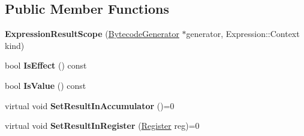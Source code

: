 \subsection*{Public Member Functions}
\begin{DoxyCompactItemize}
\item 
{\bfseries Expression\+Result\+Scope} (\hyperlink{classv8_1_1internal_1_1interpreter_1_1_bytecode_generator}{Bytecode\+Generator} $\ast$generator, Expression\+::\+Context kind)\hypertarget{classv8_1_1internal_1_1interpreter_1_1_bytecode_generator_1_1_expression_result_scope_a51adfb3450cd39cefcaf26bcd4ffcf43}{}\label{classv8_1_1internal_1_1interpreter_1_1_bytecode_generator_1_1_expression_result_scope_a51adfb3450cd39cefcaf26bcd4ffcf43}

\item 
bool {\bfseries Is\+Effect} () const \hypertarget{classv8_1_1internal_1_1interpreter_1_1_bytecode_generator_1_1_expression_result_scope_abbe25012e72d9c10bedd06449b5f65c9}{}\label{classv8_1_1internal_1_1interpreter_1_1_bytecode_generator_1_1_expression_result_scope_abbe25012e72d9c10bedd06449b5f65c9}

\item 
bool {\bfseries Is\+Value} () const \hypertarget{classv8_1_1internal_1_1interpreter_1_1_bytecode_generator_1_1_expression_result_scope_a31e3db88c75ac0ba5ff8db6fa7068706}{}\label{classv8_1_1internal_1_1interpreter_1_1_bytecode_generator_1_1_expression_result_scope_a31e3db88c75ac0ba5ff8db6fa7068706}

\item 
virtual void {\bfseries Set\+Result\+In\+Accumulator} ()=0\hypertarget{classv8_1_1internal_1_1interpreter_1_1_bytecode_generator_1_1_expression_result_scope_ab8ba50608f47cbe33f657899e31933ae}{}\label{classv8_1_1internal_1_1interpreter_1_1_bytecode_generator_1_1_expression_result_scope_ab8ba50608f47cbe33f657899e31933ae}

\item 
virtual void {\bfseries Set\+Result\+In\+Register} (\hyperlink{classv8_1_1internal_1_1interpreter_1_1_register}{Register} reg)=0\hypertarget{classv8_1_1internal_1_1interpreter_1_1_bytecode_generator_1_1_expression_result_scope_a66d3635d313e551f6e1dcaca99724053}{}\label{classv8_1_1internal_1_1interpreter_1_1_bytecode_generator_1_1_expression_result_scope_a66d3635d313e551f6e1dcaca99724053}

\end{DoxyCompactItemize}
